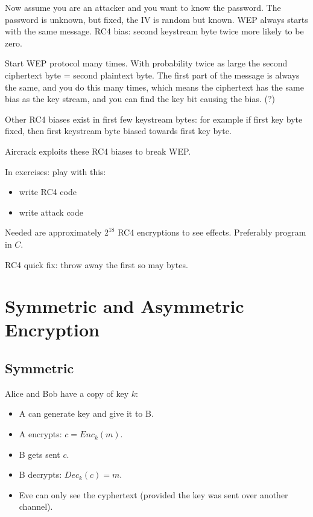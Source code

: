 \documentclass[language=english,number=]{homework}
\begin{document}
Now assume you are an attacker and you want to know the password.
    The password is unknown, but fixed, the IV is random but known.
    WEP always starts with the same message.
    RC4 bias: second keystream byte twice more likely to be zero.

    Start WEP protocol many times.
    With probability twice as large the second ciphertext byte = second plaintext byte.
    The first part of the message is always the same, and you do this many times, which means the ciphertext has the same bias as the key stream, and you can find the key bit causing the bias. (?)

    Other RC4 biases exist in first few keystream bytes: for example if first key byte fixed, then first keystream byte biased towards first key byte.

    Aircrack exploits these RC4 biases to break WEP.

    In exercises: play with this:
    \begin{itemize}
        \item write RC4 code
        \item write attack code
    \end{itemize}
    Needed are approximately $2^{18}$ RC4 encryptions to see effects.
    Preferably program in $C$.

    RC4 quick fix: throw away the first so may bytes.

    \newpage
    \section{Symmetric and Asymmetric Encryption}

    \subsection{Symmetric}

    Alice and Bob have a copy of key $k$:
    \begin{itemize}
        \item A can generate key and give it to B.
        \item A encrypts: $c = Enc_k (m)$.
        \item B gets sent $c$.
        \item B decrypts: $Dec_k(c) = m$.
        \item Eve can only see the cyphertext (provided the key was sent over another channel).
    \end{itemize}
\end{document}
